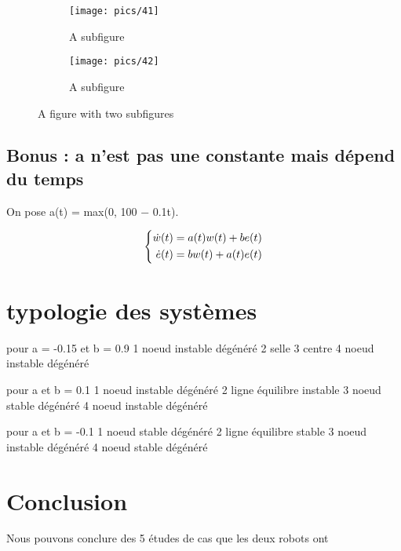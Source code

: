 \documentclass[utf8]{article}
\begin{document}
\begin{figure}
\centering
\begin{subfigure}{.5\textwidth}
  \centering
  \texttt{[image: pics/41]}
  \caption{A subfigure}
\end{subfigure}%
\begin{subfigure}{.5\textwidth}
  \centering
  \texttt{[image: pics/42]}
  \caption{A subfigure}
\end{subfigure}
\caption{A figure with two subfigures}
\end{figure}

\newpage

\subsection{Bonus : a n’est pas une constante mais dépend du temps}

On pose a(t) = max(0, 100 − 0.1t).

\begin{equation}
\centering
\left\{\begin{split}
\dot{w}(t) &= a(t)w(t) + be(t)\\
\dot{e}(t) &= bw(t) + a(t)e(t) \\
\end{split}\right.
 \end{equation}

\section{typologie des systèmes}
pour a = -0.15 et b = 0.9
1 noeud instable dégénéré
2 selle
3 centre
4 noeud instable dégénéré

pour a et b = 0.1
1 noeud instable dégénéré
2 ligne équilibre instable
3 noeud stable dégénéré
4 noeud instable dégénéré

pour a et b = -0.1
1 noeud stable dégénéré
2 ligne équilibre stable
3 noeud instable dégénéré
4 noeud stable dégénéré

\newpage
\section{Conclusion}
Nous pouvons conclure des 5 études de cas que les deux robots ont
\end{document}
